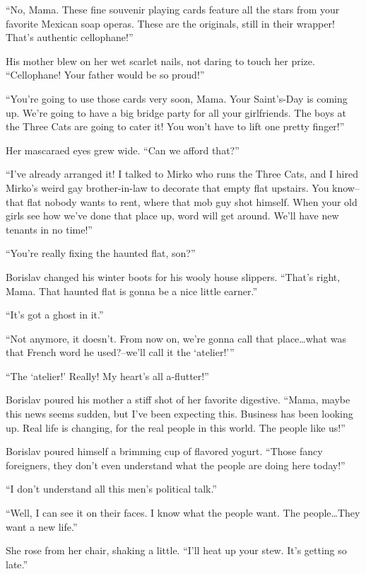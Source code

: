 \documentclass[20 pt,twoside,extrafontsizes,final]{memoir}
\begin{document}
``No, Mama. These fine souvenir playing cards feature all the stars from your favorite Mexican soap operas. These are the originals, still in their wrapper! That's authentic cellophane!''

His mother blew on her wet scarlet nails, not daring to touch her prize.
``Cellophane! Your father would be so proud!''

``You're going to use those cards very soon, Mama. Your Saint's-Day is coming up. We're going to have a big bridge party for all your girlfriends. The boys at the Three Cats are going to cater it! You won't have to lift one pretty finger!''

Her mascaraed eyes grew wide. ``Can we afford that?''

``I've already arranged it! I talked to Mirko who runs the Three Cats, and I hired Mirko's weird gay brother-in-law to decorate that empty flat upstairs. You know--that flat nobody wants to rent, where that mob guy shot himself. When your old girls see how we've done that place up, word will get around. We'll have new tenants in no time!''

``You're really fixing the haunted flat, son?''

Borislav changed his winter boots for his wooly house slippers. ``That's right, Mama. That haunted flat is gonna be a nice little earner.''

``It's got a ghost in it.''

``Not anymore, it doesn't. From now on, we're gonna call that place\dots what was that French word he used?--we'll call it the `atelier!'''

``The `atelier!' Really! My heart's all a-flutter!''

Borislav poured his mother a stiff shot of her favorite digestive. ``Mama, maybe this news seems sudden, but I've been expecting this. Business has been looking up. Real life is changing, for the real people in this world. The people like us!'' 

Borislav poured himself a brimming cup of flavored yogurt. ``Those fancy foreigners, they don't even understand what the people are doing here today!''

``I don't understand all this men's political talk.''

``Well, I can see it on their faces. I know what the people want. The people\dots They want a new life.''

She rose from her chair, shaking a little. ``I'll heat up your stew. It's getting so late.''
\end{document}
